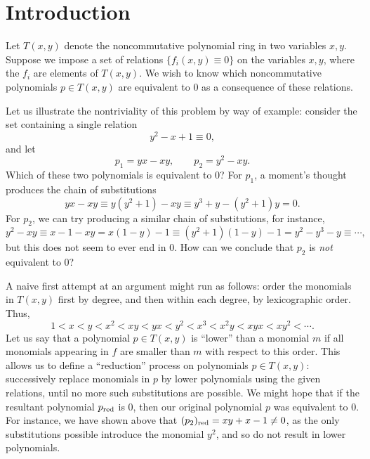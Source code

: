 \section{Introduction}\label{sec:introduction}

Let $T(x,y)$ denote the noncommutative polynomial ring in two variables $x,y$. Suppose we impose a set of relations $\{f_i(x,y)\equiv 0\}$ on the variables $x,y$, where the $f_i$ are elements of $T(x,y)$. We wish to know which noncommutative polynomials $p\in T(x,y)$ are equivalent to $0$ as a consequence of these relations.

Let us illustrate the nontriviality of this problem by way of example: consider the set containing a single relation
\begin{equation}
\label{eqn:relations}
y^2-x+1\equiv 0,
\end{equation}
and let
\begin{equation*}
p_1=yx-xy,\qquad p_2=y^2-xy.
\end{equation*}
Which of these two polynomials is equivalent to $0$? For $p_1$, a moment's thought produces the chain of substitutions
\begin{equation}
\label{eqn:p1}
yx-xy\equiv y(y^2+1)-xy\equiv y^3+y-(y^2+1)y=0.
\end{equation}
For $p_2$, we can try producing a similar chain of substitutions, for instance,
\begin{equation*}
y^2-xy\equiv x-1-xy=x(1-y)-1\equiv(y^2+1)(1-y)-1=y^2-y^3-y\equiv\cdots,
\end{equation*}
but this does not seem to ever end in $0$. How can we conclude that $p_2$ is \emph{not} equivalent to $0$?

A naive first attempt at an argument might run as follows: order the monomials in $T(x,y)$ first by degree, and then within each degree, by lexicographic order. Thus,
\begin{equation}\label{eq:deglex-two-variables}
1<x<y<x^2<xy<yx<y^2<x^3<x^2y<xyx<xy^2<\cdots.
\end{equation}
Let us say that a polynomial $p\in T(x,y)$ is ``lower'' than a monomial $m$ if all monomials appearing in $f$ are smaller than $m$ with respect to this order. This allows us to define a ``reduction'' process on polynomials $p\in T(x,y)$: successively replace monomials in $p$ by lower polynomials using the given relations, until no more such substitutions are possible. We might hope that if the resultant polynomial $p_{\mathrm{red}}$ is $0$, then our original polynomial $p$ was equivalent to $0$. For instance, we have shown above that $(p_2)_{\mathrm{red}}=xy+x-1\ne 0$, as the only substitutions possible introduce the monomial $y^2$, and so do not result in lower polynomials.


